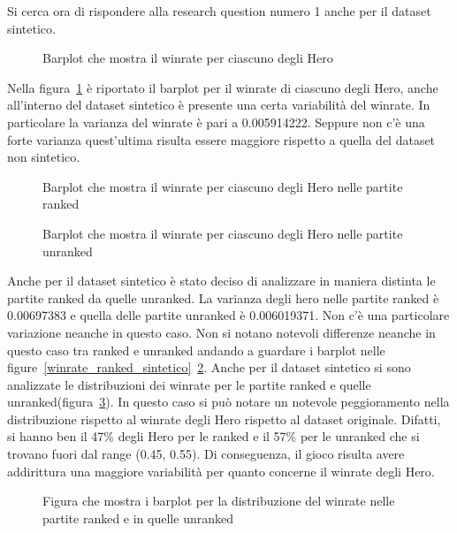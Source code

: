 Si cerca ora di rispondere alla research question numero 1 anche per il dataset sintetico.
\begin{figure}[htbp]
\begin{center}

\caption{Barplot che mostra il winrate per ciascuno degli Hero}
\label{winrate_totale_sint}
\end{center}
\end{figure}
Nella figura~\ref{winrate_totale_sint} è riportato il barplot per il winrate di ciascuno degli Hero, anche all'interno del dataset sintetico è presente una certa variabilità del winrate. In particolare la varianza del winrate è pari a 0.005914222. Seppure non c'è una forte varianza quest'ultima risulta essere maggiore rispetto a quella del dataset non sintetico.
\begin{figure}[htbp]
\begin{center}

\caption{Barplot che mostra il winrate per ciascuno degli Hero nelle partite ranked}
\label{winrate_ranked_sintetico}

\caption{Barplot che mostra il winrate per ciascuno degli Hero nelle partite unranked}
\label{winrate_unranked_sintetico}
\end{center}
\end{figure}
Anche per il dataset sintetico è stato deciso di analizzare in maniera distinta le partite ranked da quelle unranked. La varianza degli hero nelle partite ranked è 0.00697383 e quella delle partite unranked è 0.006019371. Non c'è una particolare variazione neanche in questo caso. Non si notano notevoli differenze neanche in questo caso tra ranked e unranked andando a guardare i barplot nelle figure~\ref{winrate_ranked_sintetico}~\ref{winrate_unranked_sintetico}.
Anche per il dataset sintetico si sono analizzate le distribuzioni dei winrate per le partite ranked e quelle unranked(figura~\ref{distribuzione_winrate_ranked_unranked_sintetico}). In questo caso si può notare un notevole peggioramento nella distribuzione rispetto al winrate degli Hero rispetto al dataset originale. Difatti, si hanno ben il 47\% degli Hero per le ranked e il 57\% per le unranked che si trovano fuori dal range (0.45, 0.55). Di conseguenza, il gioco risulta avere addirittura una maggiore variabilità per quanto concerne il winrate degli Hero. 
\begin{figure}[htbp]
\begin{center}

\caption{Figura che mostra i barplot per la distribuzione del winrate nelle partite ranked e in quelle unranked}
\label{distribuzione_winrate_ranked_unranked_sintetico}
\end{center}
\end{figure}